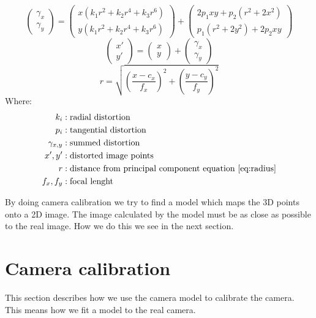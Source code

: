 \documentclass[11pt,a4paper,titlepage,oneside]{report}
\begin{document}
\begin{equation}\label{eq:dist}
	\begin{pmatrix}\gamma_{x} \\
	  \gamma_{y}
	\end{pmatrix}=\begin{pmatrix}
	  x(k_1r^2+k_2r^4+k_3r^6)\\
	  y(k_1r^2+k_2r^4+k_3r^6)
	\end{pmatrix}+\begin{pmatrix}
	  2p_1xy+p_2(r^2+2x^2)\\
	  p_1(r^2+2y^2)+2p_2xy
	\end{pmatrix}
\end{equation}
\begin{equation}\label{eq:pdist}
\begin{pmatrix}x'\\y'\end{pmatrix}=\begin{pmatrix}
x\\y\end{pmatrix}+\begin{pmatrix}\gamma_{x}\\\gamma_{y}\end{pmatrix}
\end{equation}
\begin{equation}\label{eq:radius}
	r = \sqrt{\left(\frac{x-c_x}{f_x}\right)^2+\left(\frac{y-c_y}{f_y}\right)^2}
\end{equation}
Where:
\begin{align*}
  k_{i}					&: \text{radial distortion}\\
  p_{i}					&: \text{tangential distortion}\\
	\gamma_{x,y}	&: \text{summed distortion}\\
  x',y'					&: \text{distorted image points}\\
	r							&: \text{distance from principal component equation \ref{eq:radius}} \\
	f_x,f_y				&: \text{focal lenght}
\end{align*}

By doing camera calibration we try to find a model which maps the 3D points onto a 2D image. The image calculated by the model must be as close as possible to the real image. How we do this we see in the next section.

\section{Camera calibration}\label{sec:cam_calib}
This section describes how we use the camera model to calibrate the camera. This means how we fit a model to the real camera.
\end{document}
